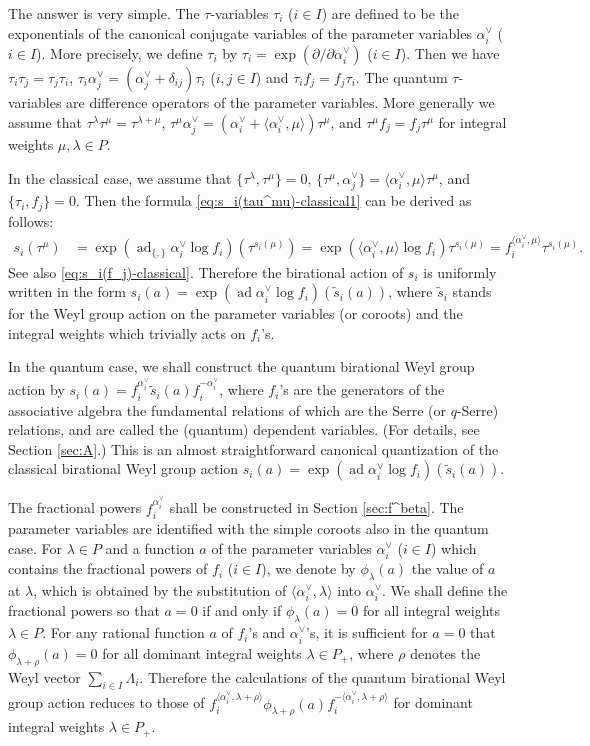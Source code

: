 \documentclass[12pt,twoside]{article}
\newcommand\bra{\langle}
\newcommand\ket{\rangle}
\newcommand\ad{\mathop{\mathrm{ad}}\nolimits}
\newcommand\av{\alpha^\vee}
\newcommand\ts{{\tilde s}}
\renewcommand\d{\partial}
\theoremstyle{plain} %
\theoremstyle{definition} %
\theoremstyle{definition} %
\numberwithin{theorem}{section}
\numberwithin{equation}{section}
\numberwithin{figure}{section}
\numberwithin{table}{section}
\newcommand\secref[1]{Section \ref{#1}}
\begin{document}
The answer is very simple. 
The $\tau$-variables $\tau_i$ ($i\in I$) are defined 
to be the exponentials of the canonical conjugate variables 
of the parameter variables $\av_i$ ($i\in I$).
More precisely, we define $\tau_i$ by $\tau_i = \exp(\d/\d\av_i)$ ($i\in I$). 
Then we have $\tau_i\tau_j=\tau_j\tau_i$, $\tau_i\av_j=(\av_j+\delta_{ij})\tau_i$ ($i,j\in I$)
and $\tau_i f_j = f_j \tau_i$.
The quantum $\tau$-variables are difference operators 
of the parameter variables.
More generally we assume that $\tau^\lambda\tau^\mu=\tau^{\lambda+\mu}$, 
$\tau^\mu\av_j=(\av_i+\bra\av_i,\mu\ket)\tau^\mu$,
and $\tau^\mu f_j=f_j\tau^\mu$
for integral weights $\mu,\lambda\in P$.

In the classical case, 
we assume that $\{\tau^\lambda,\tau^\mu\}=0$,
$\{\tau^\mu,\av_j\}=\bra\av_i,\mu\ket\tau^\mu$, and $\{\tau_i,f_j\}=0$.
Then the formula \eqref{eq:s_i(tau^mu)-classical1} can be derived as follows: 
\begin{align}
 s_i(\tau^\mu) 
 &
 = \exp(\ad_{\{,\}} \av_i \log f_i)(\tau^{s_i(\mu)})
 = \exp(\bra\av_i,\mu\ket \log f_i)\tau^{s_i(\mu)}
 = f_i^{\bra\av_i,\mu\ket}\tau^{s_i(\mu)}.
 \label{eq:s_i(tau^mu)-classical2}
\end{align}
See also \eqref{eq:s_i(f_j)-classical}.
Therefore the birational action of $s_i$ is uniformly written in the form 
$s_i(a) = \exp(\ad \av_i\log f_i)(\ts_i(a))$,
where $\ts_i$ stands for the Weyl group action on the parameter variables
(or coroots) and the integral weights which trivially acts on $f_i$'s.

In the quantum case, we shall construct the quantum birational Weyl group action by
$s_i(a)=f_i^{\av_i} \ts_i(a) f_i^{-\av_i}$, 
where $f_i$'s are the generators of 
the associative algebra the fundamental relations of which
are the Serre (or $q$-Serre) relations,
and are called the (quantum) dependent variables.
(For details, see \secref{sec:A}.)
This is an almost straightforward canonical quantization 
of the classical birational Weyl group action $s_i(a) = \exp(\ad \av_i\log f_i)(\ts_i(a))$.

The fractional powers $f_i^{\av_i}$ shall be constructed in \secref{sec:f^beta}.
The parameter variables are identified with the simple coroots also in the quantum case. 
For $\lambda\in P$ and a function $a$ of the parameter variables $\av_i$ ($i\in I$) 
which contains the fractional powers of $f_i$ ($i\in I$), 
we denote by $\phi_\lambda(a)$ the value of $a$ at $\lambda$, 
which is obtained by the substitution of $\bra\av_i,\lambda\ket$ into $\av_i$.
We shall define the fractional powers so that $a=0$ if and only if $\phi_\lambda(a)=0$
for all integral weights $\lambda\in P$.
For any rational function $a$ of $f_i$'s and $\av_i$'s,
it is sufficient for $a=0$ that $\phi_{\lambda+\rho}(a)=0$ 
for all dominant integral weights $\lambda\in P_+$,
where $\rho$ denotes the Weyl vector $\sum_{i\in I}\Lambda_i$.
Therefore the calculations of the quantum birational Weyl group action
reduces to those of 
$f_i^{\bra\av_i,\lambda+\rho\ket} \phi_{\lambda+\rho}(a) f_i^{-\bra\av_i,\lambda+\rho\ket}$ 
for dominant integral weights $\lambda\in P_+$.
\end{document}

